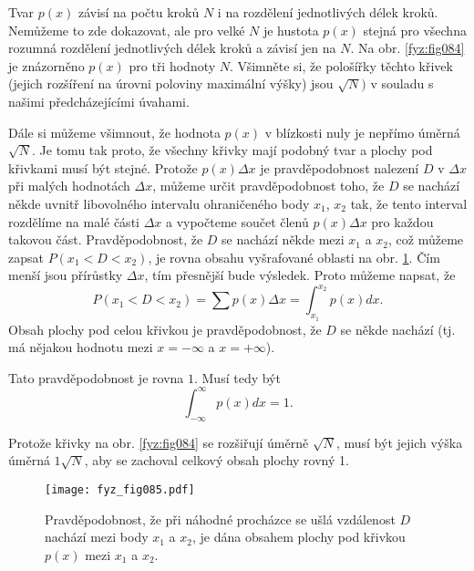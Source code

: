     Tvar \(p(x)\) závisí na počtu kroků \(N\) i na rozdělení jednotlivých délek kroků. Nemůžeme to 
    zde dokazovat, ale pro velké \(N\) je hustota \(p(x)\) stejná pro všechna rozumná rozdělení 
    jednotlivých délek kroků a závisí jen na \(N\). Na obr. \ref{fyz:fig084} je znázorněno \(p(x)\) 
    pro tři hodnoty \(N\). Všimněte si, že pološířky těchto křivek (jejich rozšíření na úrovni 
    poloviny maximální výšky) jsou \(\sqrt{N})\) v souladu s našimi předcházejícími úvahami.
    
    Dále si můžeme všimnout, že hodnota \(p(x)\) v blízkosti nuly je nepřímo úměrná \(\sqrt{N}\). 
    Je tomu tak proto, že všechny křivky mají podobný tvar a plochy pod křivkami musí být stejné. 
    Protože \(p(x)\Delta x\) je pravděpodobnost nalezení \(D\) v \(\Delta x\) při malých hodnotách 
    \(\Delta x\), můžeme určit pravděpodobnost toho, že \(D\) se nachází někde uvnitř libovolného 
    intervalu ohraničeného body \(x_1\), \(x_2\) tak, že tento interval rozdělíme na malé části 
    \(\Delta x\) a vypočteme součet členů \(p(x)\Delta x\) pro každou takovou část.     
    Pravděpodobnost, že \(D\) se nachází někde mezi \(x_1\) a \(x_2\), což můžeme zapsat \(P(x_1 < 
    D < x_2)\), je rovna obsahu vyšrafované oblasti na obr. \ref{fyz:fig085}. Čím menší jsou 
    přírůstky \(\Delta x\), tím přesnější bude výsledek. Proto můžeme napsat, že
    \begin{equation}\label{fyz:eq089}
      P(x_1 < D < x_2) = \sum p(x)\Delta x = \int_{x_1}^{x_2}p(x)dx.
    \end{equation}
    Obsah plochy pod celou křivkou je pravděpodobnost, že \(D\) se někde nachází (tj. má nějakou 
    hodnotu mezi \(x=-\infty\) a  \(x= +\infty\)).

      
    Tato pravděpodobnost je rovna \(1\). Musí tedy být
    \begin{equation}\label{fyz:eq090}
      \int_{-\infty}^{\infty}p(x)dx = 1.
    \end{equation}
    
    Protože křivky na obr. \ref{fyz:fig084} se rozšiřují úměrně \(\sqrt{N}\), musí být jejich výška 
    úměrná \(1\sqrt{N}\), aby se zachoval celkový obsah plochy rovný \num{1}.

    \begin{figure}[ht!]  %
      \centering
      \texttt{[image: fyz\_fig085.pdf]}
      \caption{Pravděpodobnost, že při náhodné procházce se ušlá vzdálenost \(D\) nachází mezi 
                body  \(x_1\) a \(x_2\), je dána obsahem plochy pod křivkou \(p(x)\) mezi \(x_1\) a 
                \(x_2\).
                \cite[s.~87]{Feynman01}}
       \label{fyz:fig085}
    \end{figure}
    
